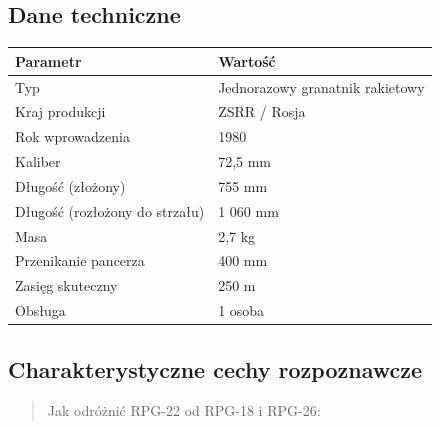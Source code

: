 \documentclass[12pt,oneside]{book}
\begin{document}
\subsection{Dane techniczne}\label{dane-techniczne-85}

\begin{longtable}[]{@{}ll@{}}
\toprule\noalign{}
Parametr & Wartość \\
\midrule\noalign{}
\endhead
\bottomrule\noalign{}
\endlastfoot
Typ & Jednorazowy granatnik rakietowy \\
Kraj produkcji & ZSRR / Rosja \\
Rok wprowadzenia & 1980 \\
Kaliber & 72,5 mm \\
Długość (złożony) & 755 mm \\
Długość (rozłożony do strzału) & 1 060 mm \\
Masa & 2,7 kg \\
Przenikanie pancerza & 400 mm \\
Zasięg skuteczny & 250 m \\
Obsługa & 1 osoba \\
\end{longtable}

\subsection{Charakterystyczne cechy
rozpoznawcze}\label{charakterystyczne-cechy-rozpoznawcze-85}

\begin{quote}
Jak odróżnić RPG-22 od RPG-18 i RPG-26:
\end{quote}
\end{document}

